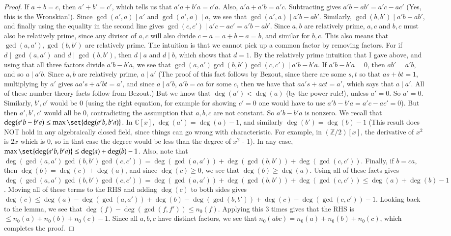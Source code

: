 \documentclass[12pt]{article}
\theoremstyle{definitionstyle}
\def\mbb#1{\mathbb{#1}}
\def \C{\mbb{C}}
\def\bZ{\mbb{Z}}
\begin{document}
 \begin{proof}
 	If $a + b = c$, then $a' + b' = c'$, which tells us that $a'a + b'a = c'a$. Also, $a'a + a'b = a'c$. Subtracting gives $a'b-ab' = a'c-ac'$ (Yes, this is the Wronskian!). Since $\gcd(a', a) \mid a'$ and $\gcd(a', a) \mid a$, we see that $\gcd(a', a) \mid a'b-ab'$. Similarly, $\gcd(b, b') \mid a'b-ab'$, and finally using the equality in the second line gives $\gcd(c, c') \mid a'c-ac' = a'b-ab'$. Since $a, b$ are relatively prime, $a, c$ and $b, c$ must also be relatively prime, since any divisor of $a, c$ will also divide $c-a = a + b - a = b$, and similar for $b,c$. This also means that $\gcd(a, a'), \gcd(b, b')$ are relatively prime. The intuition is that we cannot pick up a common factor by removing factors. For if $d \mid \gcd(a, a')$ and $d \mid \gcd(b, b')$, then $d \mid a$ and $d \mid b$, which shows that $d = 1$. By the relatively prime intuition that I gave above, and using that all three factors divide $a'b-b'a$, we see that $\gcd(a, a') \gcd(b, b') \gcd(c, c') \mid a'b-b'a$. If $a'b - b'a = 0$, then $ab' = a'b$, and so $a \mid a'b$. Since $a, b$ are relatively prime, $a \mid a'$ (The proof of this fact follows by Bezout, since there are some $s, t$ so that $as + bt = 1$, multiplying by $a'$ gives $aa's + a'bt = a'$, and since $a \mid a'b$, $a'b = ca$ for some $c$, then we have that $aa's + act = a'$, which says that $a \mid a'$. All of these number theory facts follow from Bezout.) But we know that $\deg(a') < \deg(a)$ (by the power rule!), unless $a' = 0$. So $a' = 0$. Similarly, $b', c'$ would be 0 (using the right equation, for example for showing $c' = 0$ one would have to use $a'b - b'a = a'c - ac' = 0$). But then $a', b', c'$ would all be 0, contradicting the assumption that $a, b, c$ are not constant. So $a'b-b'a$ is nonzero. We recall that $\deg(a'b-b'a) \leq \max\set{\deg(a'b, b'a)}$. In $\C[x]$, $\deg(a') = \deg(a) - 1$, and similarly $\deg(b') = \deg(b) - 1$ (This result does NOT hold in any algebraically closed field, since things can go wrong with characteristic. For example, in $(\bZ/2)[x]$, the derivative of $x^2$ is $2x$ which is $0$, so in that case the degree would be less than the degree of $x^2$ - 1). In any case, $\max\set{\deg(a'b, b'a)} \leq \deg(a) + \deg(b) - 1$. Also, note that $\deg(\gcd(a, a') \gcd(b, b') \gcd(c, c')) = \deg(\gcd(a, a')) + \deg(\gcd(b, b')) + \deg(\gcd(c, c'))$. Finally, if $b = ca$, then $\deg(b) = \deg(c) + \deg(a)$, and since $\deg(c) \geq 0$, we see that $\deg(b) \geq \deg(a)$. Using all of these facts gives $\deg(\gcd(a, a') \gcd(b, b') \gcd(c, c')) = \deg(\gcd(a, a')) + \deg(\gcd(b, b')) + \deg(\gcd(c, c')) \leq \deg(a) + \deg(b) - 1$. Moving all of these terms to the RHS and adding $\deg(c)$ to both sides gives $\deg(c) \leq \deg(a) - \deg(\gcd(a, a')) + \deg(b) - \deg(\gcd(b, b')) + \deg(c) - \deg(\gcd(c, c')) - 1$. Looking back to the lemma, we see that $\deg(f) - \deg(\gcd(f, f')) \leq n_0(f)$. Applying this 3 times gives that the RHS is $\leq n_0(a) + n_0(b) + n_0(c) - 1$. Since all $a, b, c$ have distinct factors, we see that $n_0(abc) = n_0(a) + n_0(b) + n_0(c)$, which completes the proof.
 \end{proof}
\end{document}
